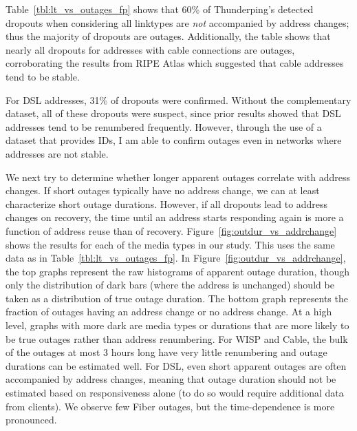  Table~\ref{tbl:lt_vs_outages_fp} shows that 60\% of Thunderping's detected dropouts when considering all linktypes are \emph{not} accompanied by address changes; thus the majority of dropouts are outages. Additionally, the table shows that nearly all dropouts for addresses with cable connections are outages, corroborating the results from RIPE Atlas which suggested that cable addresses tend to be stable. 

For DSL addresses, 31\% of dropouts were confirmed. Without the complementary dataset, all of these dropouts were suspect, since prior results showed that DSL addresses tend to be renumbered frequently. However, through the use of a dataset that provides IDs, I am able to confirm outages even in networks where addresses are not stable.

We next try to determine whether longer apparent outages
correlate with address changes.  If short outages typically
have no address change, we can at least characterize short
outage durations.  However, if all dropouts lead to address
changes on recovery, the time until an address starts
responding again is more a function of address reuse than of
recovery.  Figure~\ref{fig:outdur_vs_addrchange} shows the
results for each of the media types in our study.  This uses
the same data as in Table~\ref{tbl:lt_vs_outages_fp}.  In
Figure~\ref{fig:outdur_vs_addrchange}, the top graphs
represent the raw histograms of apparent outage duration,
though only the distribution of dark bars (where the address
is unchanged) should be taken as a distribution of true
outage duration.  The bottom graph represents the fraction
of outages having an address change or no address change.
At a high level, graphs with more dark are media types or
durations that are more likely to be true outages rather
than address renumbering.  For WISP and Cable, the bulk of
the outages at most 3 hours long have very little
renumbering and outage durations can be estimated well.  For
DSL, even short apparent outages are often accompanied by
address changes, meaning that outage duration should not be
estimated based on responsiveness alone (to do so would
require additional data from clients).  We observe few Fiber
outages, but the time-dependence is more pronounced.




